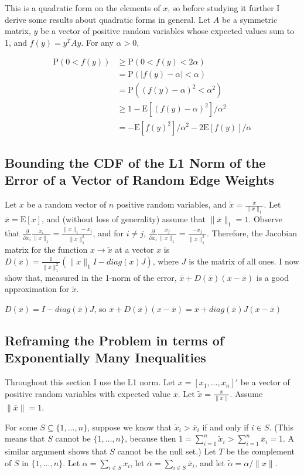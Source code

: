\documentclass{article}
\newcommand \E[1] {\mathrm E \left[#1\right]} %
\newcommand \p[1] {\mathrm P \left(#1\right)}
\begin{document}
This is a quadratic form on the elements of $x$, so before studying it further I derive some results about quadratic forms in general. Let $A$ be a symmetric matrix, $y$ be a vector of positive random variables whose expected values sum to 1, and $f(y)=y^T A y$. For any $\alpha>0$,

\begin{align*}
\p{0<f(y)} &\geq \p{0<f(y)<2\alpha} \\
&= \p{|f(y)-\alpha|<\alpha} \\
&= \p{(f(y)-\alpha)^2<\alpha^2} \\
&\geq 1- \E{(f(y)-\alpha)^2}/\alpha^2 \\
&= -\E{f(y)^2}/\alpha^2 - 2\E{f(y)}/\alpha
\end{align*}

\subsection{Bounding the CDF of the L1 Norm of the Error of a Vector of Random Edge Weights}

Let $x$ be a random vector of $n$ positive random variables, and $\tilde x=\frac x{\|x\|_1}$. Let $\overline x=\E x$, and (without loss of generality) assume that $\|\overline x\|_1=1$. Observe that $\frac\partial{\partial x_i}\frac{x_i}{\|x\|_1}=\frac{\|x\|_1-x_i}{\|x\|_1^2}$, and for $i\neq j$, $\frac\partial{\partial x_i}\frac{x_j}{\|x\|_1}=\frac{-x_j}{\|x\|_1^2}$. Therefore, the Jacobian matrix for the function $x\rightarrow \tilde x$ at a vector $x$ is $D(x)=\frac 1 {\|x\|_1^2}(\|x\|_1I-diag(x) J)$, where $J$ is the matrix of all ones. I now show that, measured in the 1-norm of the error, $\overline x + D(\overline x)(x-\overline x)$ is a good approximation for $\tilde x$.

$D(\overline x)= I-diag(\overline x) J$, so $\overline x + D(\overline x)(x-\overline x) = x+diag(\overline x) J(x-\overline x)$

\subsection{Reframing the Problem in terms of Exponentially Many Inequalities}

Throughout this section I use the L1 norm. Let $x=[x_1,\ldots,x_n]'$ be a vector of positive random variables with expected value $\overline x$. Let $\tilde x = \frac x {\|x\|}$. Assume $\|\overline x\|=1$.

For some $S\subseteq\{1,\ldots,n\}$, suppose we know that $\tilde x_i>\overline x_i$ if and only if $i\in S$. (This means that $S$ cannot be $\{1,\ldots,n\}$, because then $1=\sum_{i=1}^n \tilde x_i>\sum_{i=1}^n \overline x_i = 1$. A similar argument shows that $S$ cannot be the null set.) Let $T$ be the complement of $S$ in $\{1,\ldots,n\}$. Let $\alpha = \sum_{i\in S} x_i$, let $\overline \alpha = \sum_{i\in S} \overline x_i$, and let $\tilde \alpha = \alpha / \|x\|$.
\end{document}
